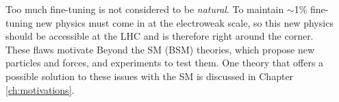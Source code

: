 Too much fine-tuning is not considered to be \textit{natural}.  To maintain $\sim$1\% fine-tuning new physics must come in at the electroweak scale, so this new physics should be accessible at the LHC and is therefore right around the corner.  \\


These flaws motivate Beyond the SM (BSM) theories, which propose new particles and forces, and experiments to test them.  One theory that offers a possible solution to these issues with the SM is discussed in Chapter \ref{ch:motivations}.




	











%
%
%
